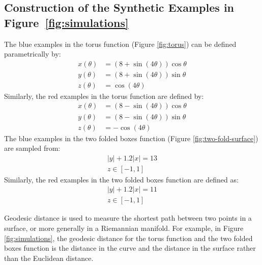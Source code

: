 \subsection{Construction of the Synthetic Examples in Figure~\ref{fig:simulations}}
\label{subsec:functions}
The blue examples in the torus function (Figure \ref{fig:torus}) can be defined parametrically by:
\begin{equation}
\begin{aligned}
 x(\theta) &= (8 + \sin(4\theta))\cos{\theta} \\
 y(\theta) &= (8 + \sin(4\theta))\sin{\theta} \\
 z(\theta) &= \cos(4\theta)
\end{aligned}
\end{equation}
Similarly, the red examples in the torus function are defined by:
\begin{equation}
\begin{aligned}
 x(\theta) &= (8 - \sin(4\theta))\cos{\theta} \\
 y(\theta) &= (8 - \sin(4\theta))\sin{\theta} \\
 z(\theta) &= -\cos(4\theta)
\end{aligned}
\end{equation}
The blue examples in the two folded boxes function (Figure \ref{fig:two-fold-surface}) are sampled from:
\begin{equation}
\begin{aligned}
 \left| y \right| + 1.2 \left| x \right| = 13\\
 z \in [-1, 1]
\end{aligned}
\end{equation}
Similarly, the red examples in the two folded boxes function are defined as:
\begin{equation}
\begin{aligned}
 \left| y \right| + 1.2 \left| x \right| = 11\\
 z \in [-1, 1]
\end{aligned}
\end{equation}

Geodesic distance is used to measure the shortest path between two points in a surface, or more generally in a Riemannian manifold. For example, in Figure \ref{fig:simulations}, the geodesic distance for the torus function and the two folded boxes function is the distance in the curve and the distance in the surface rather than the Euclidean distance.


